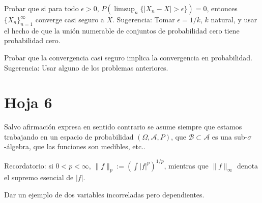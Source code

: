 
\begin{problem}[3] Probar que si para todo $\epsilon > 0$,
$P(\limsup_n\{ |X_n - X| > \epsilon\}) = 0$, entonces  $\{X_n\}_{n=1}^{\infty}$  converge casi seguro a $X$.
Sugerencia: Tomar $\epsilon = 1/k$, $k$ natural, y usar el hecho de que la uni\'on numerable de conjuntos
de probabilidad cero tiene probabilidad cero.
\solution

\begin{expla}

\end{expla}

\end{problem}


\begin{problem}[4] Probar que la convergencia casi seguro implica la convergencia en probabilidad. Sugerencia: Usar alguno de los
problemas anteriores.
\solution

\begin{expla}

\end{expla}

\end{problem}



\newpage
\section{Hoja 6}

Salvo afirmaci\'on expresa en sentido
contrario se asume siempre que estamos trabajando en un espacio de probabilidad $(\Omega, \mathcal{A}, P)$,
que  $\mathcal{B}\subset \mathcal{A}$ es una sub-$\sigma$-\'algebra, que las funciones son medibles, etc..

Recordatorio: si $0 < p < \infty$, $\|f\|_p := \left(\int|f|^p\right)^{1/p}$, mientras que
$\|f\|_\infty$ denota el supremo esencial de $|f|$. 


\begin{problem}[1] Dar un ejemplo de dos variables incorreladas pero dependientes.

\solution

\begin{expla}

\end{expla}

\end{problem}


